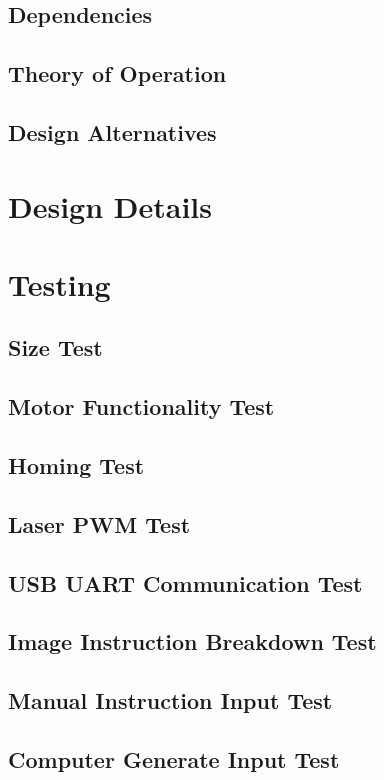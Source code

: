\documentclass[11pt]{LaTeX-Classes/math-hw}
\begin{document}
\subsection{Dependencies}
\subsection{Theory of Operation}
\subsection{Design Alternatives}


\section*{Design Details}


\section*{Testing}
\subsection{Size Test}
\subsection{Motor Functionality Test}
\subsection{Homing Test}
\subsection{Laser PWM Test}
\subsection{USB UART Communication Test}
\subsection{Image Instruction Breakdown Test}
\subsection{Manual Instruction Input Test}
\subsection{Computer Generate Input Test}
\end{document}
